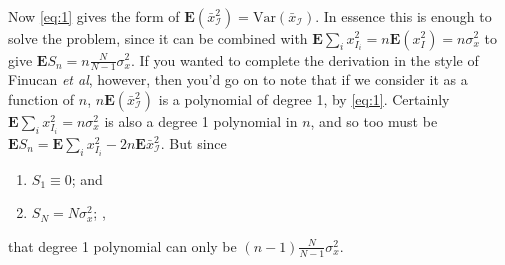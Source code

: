 \documentclass{article}
\begin{document}
\begin{enumerate}
\begin{align*}
\end{align*}
Now \eqref{eq:1} gives the form of
$\mathbf{E}(\bar{x}_\mathcal{I}^{2}) =
\mathrm{Var}(\bar{x}_\mathcal{I})$.  In essence this is enough to
solve the problem, since it can be combined with
$\mathbf{E} \sum_{i}x_{I_{i}}^{2} = n\mathbf{E}(x_{I}^{2}) = n
\sigma_{x}^{2}$ to give $\mathbf{E} S_{n} = n\frac{N}{N-1}
\sigma_{x}^{2}$.  If you wanted to complete the derivation in the
style of Finucan \textit{et al}, however, then you'd go on to note that if we
consider it as a function of $n$, $n \mathbf{E} (\bar{x}_{\mathcal{I}}^{2})$ is a
  polynomial of degree 1, by \eqref{eq:1}.  Certainly  $\mathbf{E}
  \sum_{i}x_{I_{i}}^{2} = n \sigma_{x}^{2}$ is also a degree 1
  polynomial in $n$, and so too must be $\mathbf{E} S_{n} = \mathbf{E}
  \sum_{i}x_{I_{i}}^{2} -  2n \mathbf{E}\bar{x}_\mathcal{I}^{2}$.  But
  since 
\begin{enumerate}
\item $S_{1} \equiv 0$; \label{item:2} and
\item $S_{N} = N \sigma_{x}^{2}$; \label{item:3}, 
\end{enumerate}
that degree 1 polynomial can only be $(n-1) \frac{N}{N-1} \sigma_{x}^{2}$.  

\end{enumerate}
\end{document}
